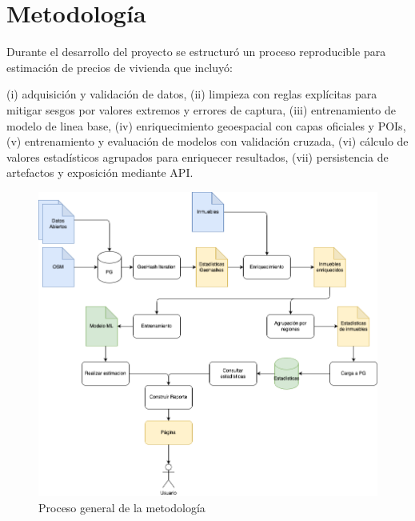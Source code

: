 \section*{Metodología}
Durante el desarrollo del proyecto se estructuró un proceso reproducible para estimación 
de precios de vivienda que incluyó: 

(i) adquisición y validación de datos, 
(ii) limpieza con reglas explícitas para mitigar sesgos por valores extremos y errores de captura,
(iii) entrenamiento de modelo de linea base, 
(iv) enriquecimiento geoespacial con capas oficiales y POIs, 
(v) entrenamiento y evaluación de modelos con validación cruzada,
(vi) cálculo de valores estadísticos agrupados para enriquecer resultados, 
(vii) persistencia de artefactos y exposición mediante API. 




\begin{figure}[h]
    \centering
    \includegraphics[width=0.85\linewidth]{Images/metodologia.png}
    \caption{Proceso general de la metodología}
    \label{fig:metodologia}
\end{figure}

